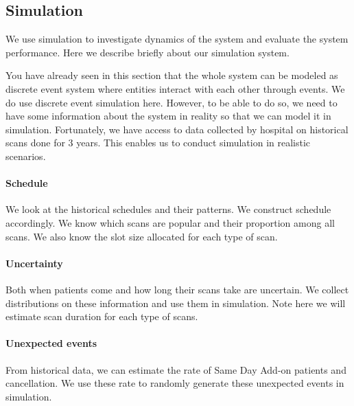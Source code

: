 \subsection{Simulation}

We use simulation to investigate dynamics of the system and evaluate the system performance. Here we describe briefly about our simulation system.

You have already seen in this section that the whole system can be modeled as discrete event system where entities interact with each other through events. We do use discrete event simulation here. However, to be able to do so, we need to have some information about the system in reality so that we can model it in simulation. Fortunately, we have access to data collected by hospital on historical scans done for 3 years. This enables us to conduct simulation in realistic scenarios.

\paragraph{Schedule} We look at the historical schedules and their patterns. We construct schedule accordingly. We know which scans are popular and their proportion among all scans. We also know the slot size allocated for each type of scan.
\paragraph{Uncertainty} Both when patients come and how long their scans take are uncertain. We collect distributions on these information and use them in simulation. Note here we will estimate scan duration for each type of scans.
\paragraph{Unexpected events} From historical data, we can estimate the rate of Same Day Add-on patients and cancellation. We use these rate to randomly generate these unexpected events in simulation.

